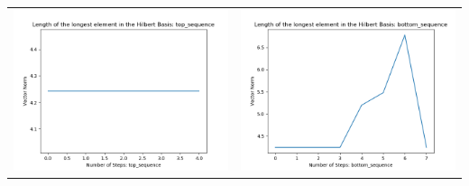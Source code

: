 \documentclass[10pt]{article}
\begin{document}
\begin{tabular}{c|c}
\begin{minipage}{.4\textwidth}
\includegraphics[width=\textwidth]{"DATA/4d/4 generators 2 bound H/top_sequence LENGTH"}
\end{minipage} &
\begin{minipage}{.4\textwidth}
\includegraphics[width=\textwidth]{"DATA/4d/4 generators 2 bound H bottomup/bottom_sequence LENGTH"}
\end{minipage}
\end{tabular}
\end{document}
